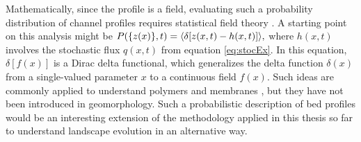 Mathematically, since the profile is a field, evaluating such a probability distribution of channel profiles requires statistical field theory \citep{Kardar2007}.
A starting point on this analysis might be $P(\{z(x)\},t) = \langle \delta[z(x,t)-h(x,t)]\rangle,$ where $h(x,t)$ involves the stochastic flux $q(x,t)$ from equation \ref{eq:stocEx}.
In this equation, $\delta[f(x)]$ is a Dirac delta functional, which generalizes the delta function $\delta(x)$ from a single-valued parameter $x$ to a continuous field $f(x)$.
Such ideas are commonly applied to understand polymers and membranes \citep{Kawakatsu2001,Nelson2004}, but they have not been introduced in geomorphology. Such a probabilistic description of bed profiles would be an interesting extension of the methodology applied in this thesis so far to understand landscape evolution in an alternative way.
